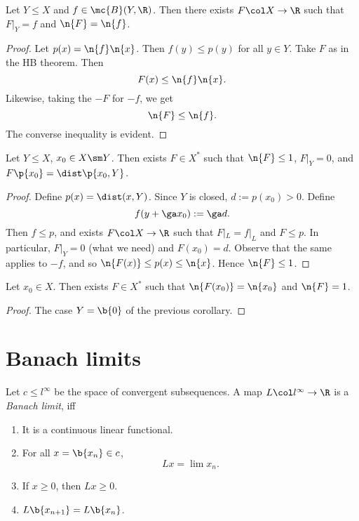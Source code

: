 \begin{corollary}
  Let $Y \le X$ and $f \in \mc{B}(Y, \R)$. Then there exists $F \col X \to \R$ such that $F|_Y = f$ and $\n{F} = \n{f}$.
\end{corollary}

\begin{proof}
  Let $p(x) = \n{f} \n{x}$. Then $f(y) \le p(y)$ for all $y \in Y$.
  Take $F$ as in the HB theorem.
  Then
  $$ F(x) \le \n{f} \n{x}. $$
  Likewise, taking the $-F$ for $-f$, we get
  $$ \n{F} \le \n{f}. $$
  The converse inequality is evident.
\end{proof}

\begin{corollary}
  Let $Y \le X$, $x_0 \in X \sm Y$. Then exists $F \in X^*$ such that $\n{F} \le 1$, $F|_Y = 0$, and $F\p{x_0} = \dist\p{x_0, Y}$.
\end{corollary}

\begin{proof}
  Define $p(x) = \dist(x, Y)$.
  Since $Y$ is closed, $d := p(x_0) > 0$.
  Define
  $$ f(y+\ga x_0) := \ga d. $$
  Then $f \le p$, and exists $F \col X \to \R$ such that $F|_L = f|_L$ and $F \le p$.
  In particular, $F|_Y = 0$ (what we need) and $F(x_0) = d$.
  Observe that the same applies to $-f$, and so $\n{F(x)} \le p(x) \le \n{x}$.
  Hence $\n{F} \le 1$.
\end{proof}

\begin{corollary}
  Let $x_0 \in X$. Then exists $F \in X^*$ such that $\n{F(x_0)} = \n{x_0}$ and $\n{F} = 1$.
\end{corollary}

\begin{proof}
  The case $Y = \b{0}$ of the previous corollary.
\end{proof}

\section{Banach limits}

\begin{definition}
  Let $c \le l^\infty$ be the space of convergent subsequences.
  A map $L \col l^\infty \to \R$ is a \emph{Banach limit}, iff
  \begin{enumerate}
    \item It is a continuous linear functional.
    \item For all $x = \b{x_n} \in c$, $$ Lx = \lim x_n. $$
    \item If $x \ge 0$, then $Lx \ge 0$.
    \item $L\b{x_{n+1}} = L\b{x_n}$.
  \end{enumerate}
\end{definition}

